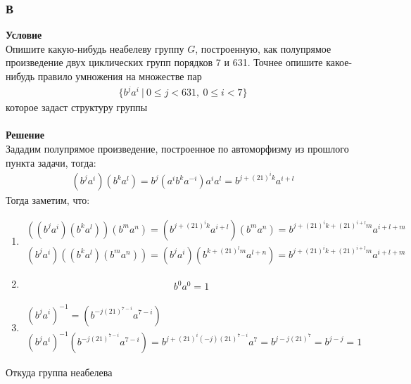 			\subsubsection*{В}
			\textbf{Условие}\\
			Опишите какую-нибудь неабелеву группу $G$, построенную, как полупрямое произведение двух циклических групп порядков 7 и 631. Точнее опишите какое-нибудь правило умножения на множестве пар
			\begin{gather*}
				\{b^{j} a^{i}\: |\: 0 \leqslant j<631,\: 0 \leqslant i<7\}
			\end{gather*}
			которое задаст структуру группы\\
			\\
			\textbf{Решение}\\
			Зададим полупрямое произведение, построенное по автоморфизму из прошлого пункта задачи, тогда:
			\begin{gather*}
				(b^{j} a^{i})(b^{k} a^{l}) = b^{j}(a^{i}b^{k}a^{-i})a^{i}a^{l} = b^{j + (21)^{i}k} a^{i+l}
			\end{gather*} 
			Тогда заметим, что:
			\begin{enumerate}
				\item 
					\begin{gather*}
						((b^{j} a^{i})(b^{k} a^{l}))(b^{m} a^{n}) = (b^{j + (21)^{i}k} a^{i+l})(b^{m} a^{n}) = b^{j + (21)^{i}k + (21)^{i+l}m} a^{i+l+m}\\
						(b^{j} a^{i})((b^{k} a^{l})(b^{m} a^{n})) = (b^{j} a^{i})(b^{k + (21)^{l}m} a^{l+n}) = b^{j + (21)^{i}k + (21)^{i+l}m} a^{i+l+m}
					\end{gather*}
				\item 
					\begin{gather*}
						b^{0} a^{0} = 1
					\end{gather*}
				\item 
					\begin{gather*}
						(b^{j} a^{i})^{-1} = (b^{-j(21)^{7-i}} a^{7-i})\\
						(b^{j} a^{i})^{-1}(b^{-j(21)^{7-i}} a^{7-i}) = b^{j +(21)^{i}(-j)(21)^{7-i}} a^{7} = b^{j - j(21)^{7}} = b^{j-j} = 1
					\end{gather*}
			\end{enumerate}
			Откуда группа неабелева
			
			
